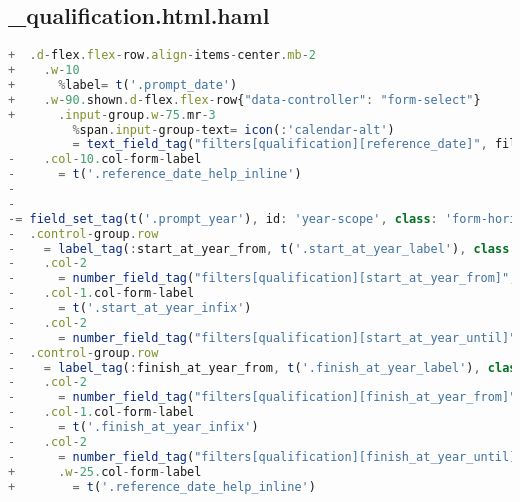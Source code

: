 \newpage

\subsection{\_qualification.html.haml}
\begin{lstlisting}[language=JavaScript]
+  .d-flex.flex-row.align-items-center.mb-2
+    .w-10
+      %label= t('.prompt_date')
+    .w-90.shown.d-flex.flex-row{"data-controller": "form-select"}
+      .input-group.w-75.mr-3
         %span.input-group-text= icon(:'calendar-alt')
         = text_field_tag("filters[qualification][reference_date]", filter_args[:reference_date], class: 'date form-control form-control-sm')
-    .col-10.col-form-label
-      = t('.reference_date_help_inline')
-
-
-= field_set_tag(t('.prompt_year'), id: 'year-scope', class: 'form-horizontal', style: "display: #{filter_args[:validity] == 'all' ? 'block' : 'none'};") do
-  .control-group.row
-    = label_tag(:start_at_year_from, t('.start_at_year_label'), class: 'control-label col-form-label col-2')
-    .col-2
-      = number_field_tag("filters[qualification][start_at_year_from]", filter_args[:start_at_year_from], class: 'form-control form-control-sm', placeholder: 'YYYY' )
-    .col-1.col-form-label
-      = t('.start_at_year_infix')
-    .col-2
-      = number_field_tag("filters[qualification][start_at_year_until]", filter_args[:start_at_year_until], class: 'form-control form-control-sm', placeholder: 'YYYY')
-  .control-group.row
-    = label_tag(:finish_at_year_from, t('.finish_at_year_label'), class: 'control-label col-form-label col-2')
-    .col-2
-      = number_field_tag("filters[qualification][finish_at_year_from]", filter_args[:finish_at_year_from], class: 'form-control form-control-sm', placeholder: 'YYYY')
-    .col-1.col-form-label
-      = t('.finish_at_year_infix')
-    .col-2
-      = number_field_tag("filters[qualification][finish_at_year_until]", filter_args[:finish_at_year_until], class: 'form-control form-control-sm', placeholder: 'YYYY'  )
+      .w-25.col-form-label
+        = t('.reference_date_help_inline')
\end{lstlisting}

\newpage

